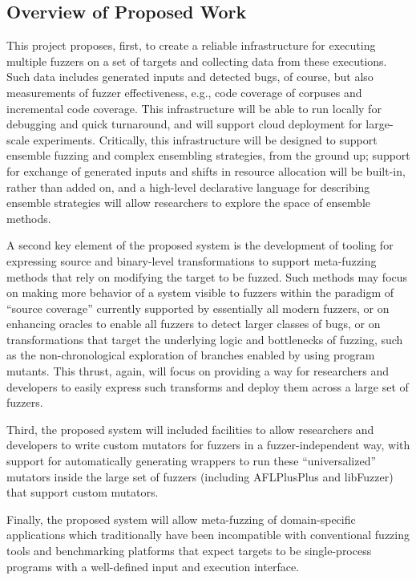 
\subsection{Overview of Proposed Work}

This project proposes, first, to create a reliable infrastructure for executing 
multiple fuzzers on a set of targets and collecting data from these executions. 
 Such data includes generated inputs and detected bugs, of course, but also 
measurements of fuzzer effectiveness, e.g., code coverage of corpuses and 
incremental code coverage.  This infrastructure will be able to run locally for 
debugging and quick turnaround, and will support cloud deployment for 
large-scale experiments. Critically, this infrastructure will be designed to 
support ensemble fuzzing and complex ensembling strategies, from the ground up; 
support for exchange of generated inputs and shifts in resource allocation will 
be built-in, rather than added on, and a high-level declarative language for 
describing ensemble strategies will allow researchers to explore the space of 
ensemble methods.

A second key element of the proposed system is the development of tooling for 
expressing source and binary-level transformations to support meta-fuzzing 
methods that rely on modifying the target to be fuzzed.  Such methods may focus 
on making more behavior of a system visible to fuzzers within the paradigm of 
``source coverage'' currently supported by essentially all modern fuzzers, or 
on enhancing oracles to enable all fuzzers to detect larger classes of bugs, or 
on transformations that target the underlying logic and bottlenecks of fuzzing, 
such as the non-chronological exploration of branches enabled by using program 
mutants.  This thrust, again, will focus on providing a way for researchers and 
developers to easily express such transforms and deploy them across a large set 
of fuzzers.

Third, the proposed system will included facilities to allow researchers and developers to 
write custom mutators for fuzzers in a fuzzer-independent way, with support for 
automatically generating wrappers to run these ``universalized'' mutators 
inside the large set of fuzzers (including AFLPlusPlus and libFuzzer) that 
support custom mutators.

Finally, the proposed system will allow meta-fuzzing of domain-specific applications
which traditionally have been incompatible with conventional fuzzing tools and
benchmarking platforms that expect targets to be single-process programs with
a well-defined input and execution interface.

